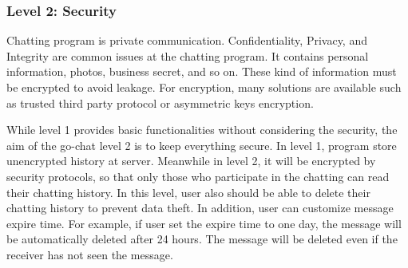 \documentclass[a4paper]{article}
\begin{document}






\subsubsection{Level 2: Security}

Chatting program is private communication. Confidentiality, Privacy, and Integrity are common issues at the chatting program. It contains personal information, photos, business secret, and so on. These kind of information must be encrypted to avoid leakage. For encryption, many solutions are available such as trusted third party protocol or asymmetric keys encryption.

While level 1 provides basic functionalities without considering the security, the aim of the go-chat level 2 is to keep everything secure. In level 1, program store unencrypted history at server. Meanwhile in level 2, it will be encrypted by security protocols, so that only those who participate in the chatting can read their chatting history. In this level, user also should be able to delete their chatting history to prevent data theft. In addition, user can customize message expire time. For example, if user set the expire time to one day, the message will be automatically deleted after 24 hours. The message will be deleted even if the receiver has not seen the message.
\end{document}
